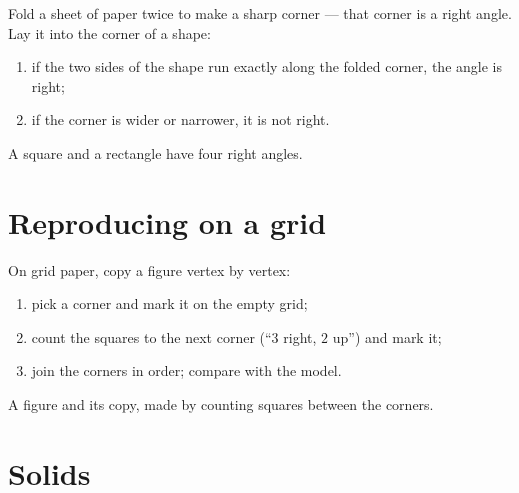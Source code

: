 \begin{method}\label{met:g2:shapes:rightangle}
Fold a sheet of paper twice to make a sharp corner --- that corner
is a right angle. Lay it into the corner of a shape:
\begin{enumerate}
  \item if the two sides of the shape run exactly along the folded
        corner, the angle is right;
  \item if the corner is wider or narrower, it is not right.
\end{enumerate}
A square and a rectangle have four right angles.
\end{method}

\section{Reproducing on a grid}

\begin{method}\label{met:g2:shapes:copy}
On grid paper, copy a figure vertex by vertex:
\begin{enumerate}
  \item pick a corner and mark it on the empty grid;
  \item count the squares to the next corner (``$3$ right, $2$
        up'') and mark it;
  \item join the corners in order; compare with the model.
\end{enumerate}
\end{method}

\begin{omfigure}

{\small A figure and its copy, made by counting squares between the
corners.}
\end{omfigure}

\section{Solids}

